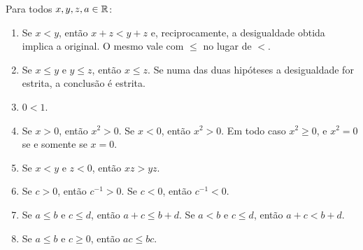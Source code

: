 \documentclass[11pt,a4paper]{article}
\begin{document}
\begin{proposicao}\label{prop:ordem-basica}
Para todos $x,y,z,a\in\mathbb{R}$:
\begin{enumerate}
\item Se $x<y$, então $x+z<y+z$ e, reciprocamente, a desigualdade obtida implica a original. O mesmo vale com $\le$ no lugar de $<$.
\item Se $x\le y$ e $y\le z$, então $x\le z$. Se numa das duas hipóteses a desigualdade for estrita, a conclusão é estrita.
\item $0<1$.
\item Se $x>0$, então $x^2>0$. Se $x<0$, então $x^2>0$. Em todo caso $x^2\ge 0$, e $x^2=0$ se e somente se $x=0$.
\item Se $x<y$ e $z<0$, então $xz>yz$.
\item Se $c>0$, então $c^{-1}>0$. Se $c<0$, então $c^{-1}<0$.
\item Se $a\le b$ e $c\le d$, então $a+c\le b+d$. Se $a<b$ e $c\le d$, então $a+c<b+d$.
\item Se $a\le b$ e $c\ge 0$, então $ac\le bc$.
\end{enumerate}
\end{proposicao}
\end{document}
